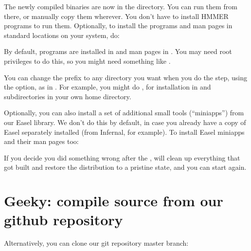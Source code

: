   \vspace{1ex}
  \vspace{1ex}

The newly compiled binaries are now in the  directory.  You
can run them from there, or manually copy them wherever.  You don't
have to install HMMER programs to run them. Optionally, to install the
programs and man pages in standard locations on your system, do:

  \vspace{1ex}
  \vspace{1ex}

By default, programs are installed in  and man
pages in . You may need root
privileges to do this, so you might need something like .

You can change the  prefix to any directory you want
when you do the  step, using the  option, as in . For example, you might do
, for installation in
 and  subdirectories in your own home
directory.

Optionally, you can also install a set of additional small tools
(``miniapps'') from our Easel library.  We don't do this by default,
in case you already have a copy of Easel separately installed (from
Infernal, for example). To install Easel miniapps and their man pages
too:

  \vspace{1ex}
  \vspace{1ex}

If you decide you did something wrong after the ,
 will clean up everything that got built and
restore the distribution to a pristine state, and you can start again.


\section{Geeky: compile source from our github repository}

Alternatively, you can clone our git repository master
branch:
  
